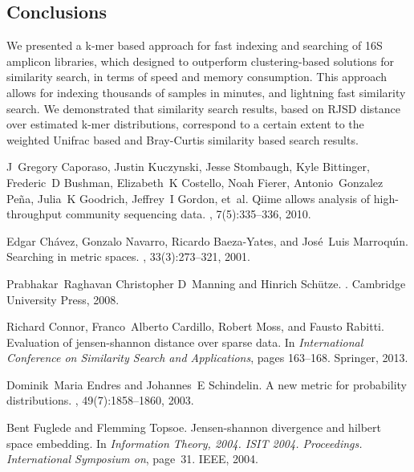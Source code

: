 \documentclass[10pt,letterpaper]{article}
\begin{document}
\subsection*{Conclusions}
We presented a k-mer based approach for fast indexing and searching of 16S amplicon libraries, which designed to outperform clustering-based solutions for similarity search, in terms of speed and memory consumption.
This approach allows for indexing thousands of samples in minutes, and lightning fast similarity search. We demonstrated that similarity search results, based on RJSD distance over estimated k-mer distributions, correspond to a certain extent to the weighted Unifrac based and Bray-Curtis similarity based search results.


\begin{thebibliography}{10}

J~Gregory Caporaso, Justin Kuczynski, Jesse Stombaugh, Kyle Bittinger,
  Frederic~D Bushman, Elizabeth~K Costello, Noah Fierer, Antonio~Gonzalez
  Pe{\~n}a, Julia~K Goodrich, Jeffrey~I Gordon, et~al.
\newblock Qiime allows analysis of high-throughput community sequencing data.
, 7(5):335--336, 2010.

Edgar Ch{\'a}vez, Gonzalo Navarro, Ricardo Baeza-Yates, and Jos{\'e}~Luis
  Marroqu{\'\i}n.
\newblock Searching in metric spaces.
, 33(3):273--321, 2001.

Prabhakar~Raghavan Christopher D~Manning and Hinrich Schütze.
.
\newblock Cambridge University Press, 2008.

Richard Connor, Franco~Alberto Cardillo, Robert Moss, and Fausto Rabitti.
\newblock Evaluation of jensen-shannon distance over sparse data.
\newblock In {\em International Conference on Similarity Search and
  Applications}, pages 163--168. Springer, 2013.

Dominik~Maria Endres and Johannes~E Schindelin.
\newblock A new metric for probability distributions.
, 49(7):1858--1860,
  2003.

Bent Fuglede and Flemming Topsoe.
\newblock Jensen-shannon divergence and hilbert space embedding.
\newblock In {\em Information Theory, 2004. ISIT 2004. Proceedings.
  International Symposium on}, page~31. IEEE, 2004.


\end{thebibliography}
\end{document}

